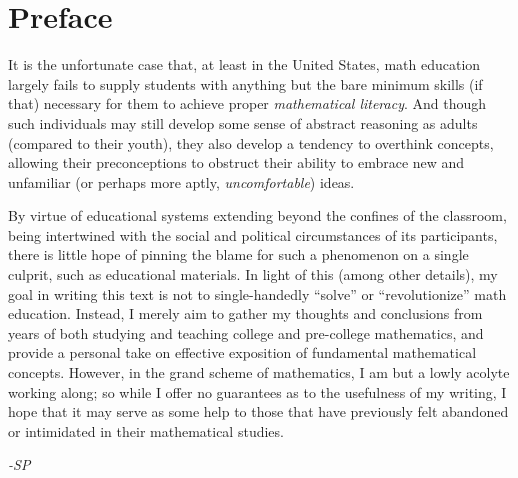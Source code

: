 \chapter*{Preface}

It is the unfortunate case that, at least in the United States, math education
largely fails to supply students with anything but the bare minimum skills
(if that) necessary for them to achieve proper \textit{mathematical literacy}.
And though such individuals may still develop some sense of abstract reasoning
as adults (compared to their youth), they also develop a tendency to overthink
concepts, allowing their preconceptions to obstruct their ability to embrace
new and unfamiliar (or perhaps more aptly, \textit{uncomfortable}) ideas.

By virtue of educational systems extending beyond the confines of the classroom,
being intertwined with the social and political circumstances of its participants,
there is little hope of pinning the blame for such a phenomenon on a single
culprit, such as educational materials.
In light of this (among other details), my goal in writing this text is not to
single-handedly ``solve'' or ``revolutionize'' math education.
Instead, I merely aim to gather my thoughts and conclusions from years of both
studying and teaching college and pre-college mathematics, and provide a personal
take on effective exposition of fundamental mathematical concepts.
However, in the grand scheme of mathematics, I am but a lowly acolyte working
along; so while I offer no guarantees as to the usefulness of my writing, I hope
that it may serve as some help to those that have previously felt abandoned or
intimidated in their mathematical studies.

\flushright
\textit{-SP}
\flushleft
